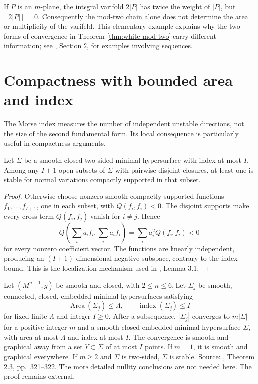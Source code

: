 \begin{example}\label{ex:even-multiplicity}
If $P$ is an $m$-plane, the integral varifold $2|P|$ has twice the weight of $|P|$, but $[2|P|]=0$. Consequently the mod-two chain alone does not determine the area or multiplicity of the varifold. This elementary example explains why the two forms of convergence in Theorem \ref{thm:white-mod-two} carry different information; see \cite{White09}, Section 2, for examples involving sequences.
\end{example}

\chapter{Compactness with bounded area and index}\label{sec:bounded-index-compactness}
The Morse index measures the number of independent unstable directions, not the size of the second fundamental form. Its local consequence is particularly useful in compactness arguments.

\begin{lemma}\label{lem:disjoint-unstable-regions}
Let $\Sigma$ be a smooth closed two-sided minimal hypersurface with index at most $I$. Among any $I+1$ open subsets of $\Sigma$ with pairwise disjoint closures, at least one is stable for normal variations compactly supported in that subset.
\end{lemma}
\begin{proof}
Otherwise choose nonzero smooth compactly supported functions $f_1,\ldots,f_{I+1}$, one in each subset, with $Q(f_i,f_i)<0$. The disjoint supports make every cross term $Q(f_i,f_j)$ vanish for $i\ne j$. Hence
\[
 Q\left(\sum_i a_if_i,\sum_i a_if_i\right)=\sum_i a_i^2Q(f_i,f_i)<0
\]
for every nonzero coefficient vector. The functions are linearly independent, producing an $(I+1)$-dimensional negative subspace, contrary to the index bound. This is the localization mechanism used in \cite{Sharp17}, Lemma 3.1.
\end{proof}

\begin{theorem}\label{thm:sharp-compactness}
Let $(M^{n+1},g)$ be smooth and closed, with $2\leq n\leq6$. Let $\Sigma_j$ be smooth, connected, closed, embedded minimal hypersurfaces satisfying
\[
 \operatorname{Area}(\Sigma_j)\leq\Lambda,\qquad
 \operatorname{index}(\Sigma_j)\leq I
\]
for fixed finite $\Lambda$ and integer $I\geq0$. After a subsequence, $|\Sigma_j|$ converges to $m|\Sigma|$ for a positive integer $m$ and a smooth closed embedded minimal hypersurface $\Sigma$, with area at most $\Lambda$ and index at most $I$. The convergence is smooth and graphical away from a set $Y\subset\Sigma$ of at most $I$ points. If $m=1$, it is smooth and graphical everywhere. If $m\geq2$ and $\Sigma$ is two-sided, $\Sigma$ is stable. Source: \cite{Sharp17}, Theorem 2.3, pp.~321--322. The more detailed nullity conclusions are not needed here. The proof remains external.
\end{theorem}

